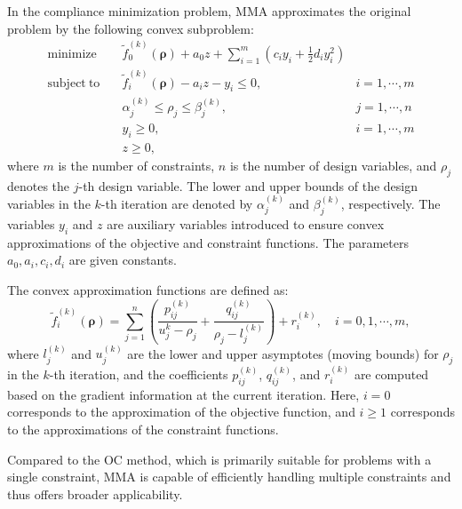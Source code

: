 \documentclass[mathpazo]{cicp}
\begin{document}
In the compliance minimization problem, MMA approximates the original problem by the following convex subproblem:
\begin{equation*}
	\begin{aligned}
		\mathrm{minimize}\quad&\tilde{f}_0^{(k)}(\boldsymbol{\rho}) + a_0z + \sum_{i=1}^m(c_iy_i+\frac{1}{2}d_iy_i^2)\\
		\mathrm{subject~to}\quad&\tilde{f}_i^{(k)}(\boldsymbol{\rho}) - a_iz - y_i \leq 0,\quad&{i}=1,\cdots,m\\
		\quad&\alpha_j^{(k)}\leq{\rho}_j\leq\beta_j^{(k)},\quad&{j}=1,\cdots,n\\
		\quad&{y}_i\geq0,\quad&i=1,\cdots,m\\
		\quad&{z}\geq0,
	\end{aligned}
\end{equation*}
where $m$ is the number of constraints, $n$ is the number of design variables, and $\rho_j$ denotes the $j$-th design variable. The lower and upper bounds of the design variables in the $k$-th iteration are denoted by $\alpha_j^{(k)}$ and $\beta_j^{(k)}$, respectively. The variables $y_i$ and $z$ are auxiliary variables introduced to ensure convex approximations of the objective and constraint functions. The parameters $a_0, a_i, c_i, d_i$ are given constants. 

The convex approximation functions are defined as: 
\begin{equation*}
	\tilde{f}_i^{(k)}(\boldsymbol{\rho}) = \sum_{j=1}^n\left(\frac{p_{ij}^{(k)}}{u_{j}^k-\rho_j} + \frac{q_{ij}^{(k)}}{\rho_{j}-l_j^{(k)}}\right) + r_i^{(k)},\quad{i}=0,1,\cdots,m,
\end{equation*}
where $l_j^{(k)}$ and $u_j^{(k)}$ are the lower and upper asymptotes (moving bounds) for $\rho_j$ in the $k$-th iteration, and the coefficients $p_{ij}^{(k)}$, $q_{ij}^{(k)}$, and $r_i^{(k)}$ are computed based on the gradient information at the current iteration. Here, $i = 0$ corresponds to the approximation of the objective function, and $i \geq 1$ corresponds to the approximations of the constraint functions.

Compared to the OC method, which is primarily suitable for problems with a single constraint, MMA is capable of efficiently handling multiple constraints and thus offers broader applicability.
\end{document}
